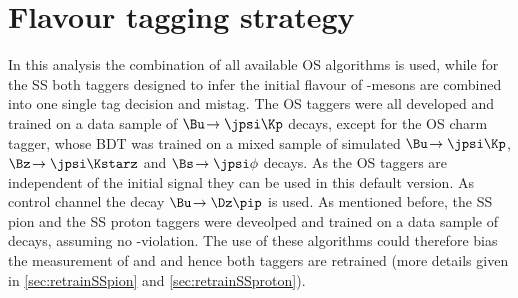 \section{Flavour tagging strategy}
\label{sec:taggingstrategy}

In this analysis the combination of all available OS algorithms is used, while for the SS both taggers designed to infer the initial flavour of \Bz-mesons are combined into one single tag decision and mistag.
The OS taggers were all developed and trained on a data sample of $\Bu\!\to\jpsi\Kp$ decays, except for the OS charm tagger, whose BDT was trained on a mixed sample of simulated $\Bu\!\to\jpsi\Kp$, $\Bz\!\to\jpsi\Kstarz$ and $\Bs\!\to\jpsi\phi$ decays.
As the OS taggers are independent of the initial signal \B they can be used in this default version.
As control channel the decay $\Bu\!\to\Dz\pip$ is used.
As mentioned before, the SS pion and the SS proton taggers were deveolped and trained on a data sample of \BdToDpi decays, assuming no \CP-violation.
The use of these algorithms could therefore bias the measurement of \Sf and \Sfbar and hence both taggers are retrained (more details given in \cref{sec:retrainSSpion} and \cref{sec:retrainSSproton}).

